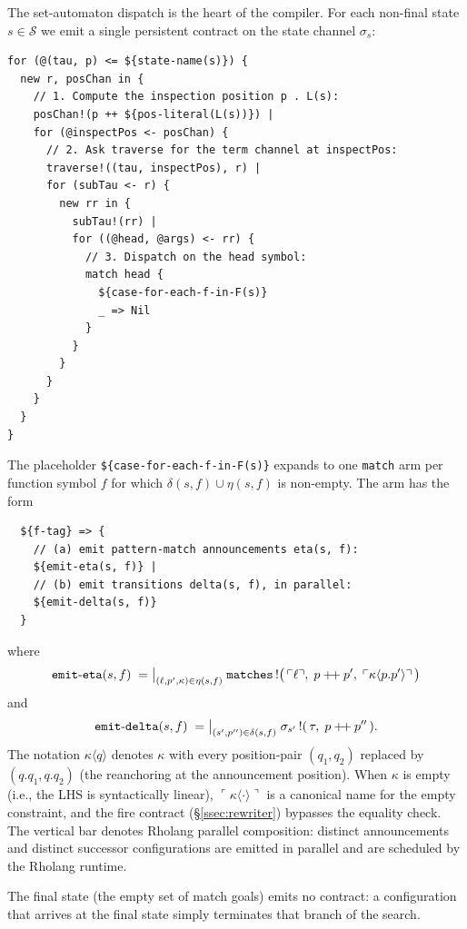 \documentclass[11pt]{article}
\theoremstyle{plain}
\theoremstyle{definition}
\theoremstyle{remark}
\newcommand{\reflect}[1]{\ulcorner #1 \urcorner}
\newcommand{\States}{\mathcal{S}}
\begin{document}
The set-automaton dispatch is the heart of the compiler. For each
non-final state $s \in \States$ we emit a single persistent contract on
the state channel $\sigma_s$:
\begin{lstlisting}
for (@(tau, p) <= ${state-name(s)}) {
  new r, posChan in {
    // 1. Compute the inspection position p . L(s):
    posChan!(p ++ ${pos-literal(L(s))}) |
    for (@inspectPos <- posChan) {
      // 2. Ask traverse for the term channel at inspectPos:
      traverse!((tau, inspectPos), r) |
      for (subTau <- r) {
        new rr in {
          subTau!(rr) |
          for ((@head, @args) <- rr) {
            // 3. Dispatch on the head symbol:
            match head {
              ${case-for-each-f-in-F(s)}
              _ => Nil
            }
          }
        }
      }
    }
  }
}
\end{lstlisting}
The placeholder \texttt{\$\{case-for-each-f-in-F(s)\}} expands to one
\texttt{match} arm per function symbol $f$ for which $\delta(s, f) \cup
\eta(s, f)$ is non-empty. The arm has the form
\begin{lstlisting}
  ${f-tag} => {
    // (a) emit pattern-match announcements eta(s, f):
    ${emit-eta(s, f)} |
    // (b) emit transitions delta(s, f), in parallel:
    ${emit-delta(s, f)}
  }
\end{lstlisting}
where
\[
  \mathtt{emit\text{-}eta}(s, f) \;=\;
  \bigm|_{(\ell, p', \kappa) \in \eta(s, f)}
  \mathtt{matches}\,!\bigl(\,\reflect{\ell},\; p \mathbin{+\!+} p',\;
                            \reflect{\kappa\langle p.p'\rangle}\,\bigr)
\]
and
\[
  \mathtt{emit\text{-}delta}(s, f) \;=\;
  \bigm|_{(s', p'') \in \delta(s, f)}
  \sigma_{s'}\,!(\,\tau,\; p \mathbin{+\!+} p''\,).
\]
The notation $\kappa\langle q \rangle$ denotes $\kappa$ with every
position-pair $(q_1, q_2)$ replaced by $(q.q_1, q.q_2)$ (the
reanchoring at the announcement position). When $\kappa$ is empty
(i.e., the LHS is syntactically linear), $\reflect{\kappa\langle \cdot \rangle}$
is a canonical name for the empty constraint, and the fire contract
(\S\ref{ssec:rewriter}) bypasses the equality check.
The vertical bar denotes Rholang parallel composition: distinct
announcements and distinct successor configurations are emitted in
parallel and are scheduled by the Rholang runtime.

The final state (the empty set of match goals) emits no contract: a
configuration that arrives at the final state simply terminates that
branch of the search.
\end{document}
